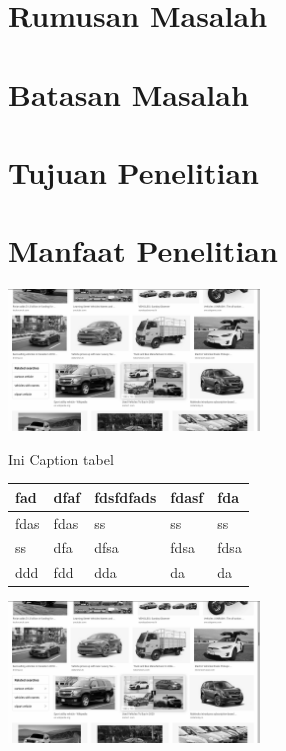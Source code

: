 \section{Rumusan Masalah}

\section{Batasan Masalah}

\section{Tujuan Penelitian}

\section{Manfaat Penelitian}




\begin{afigure}
    \label{fig:figure2}
    \includegraphics[width=0.5\textwidth, center]{images/input.png}
    \caption{Sebuah gambar}
\end{afigure}

\begin{atable}{Ini Caption tabel}
    \label{table:tabl}
    \begin{tabular}{|l|l|l|l|l|}
    \hline
    fad  & dfaf & fdsfdfads & fdasf & fda  \\
    \hline
    fdas & fdas & ss        & ss    & ss   \\
    \hline
    ss   & dfa  & dfsa      & fdsa  & fdsa \\
    \hline
    ddd  & fdd  & dda       & da    & da \\
    \hline
    \end{tabular}
\end{atable}


\begin{afigure}
    \label{fig:f1}
    \includegraphics[width=0.5\textwidth, center]{images/input.png}
    \caption{ini gambar na}
\end{afigure}
